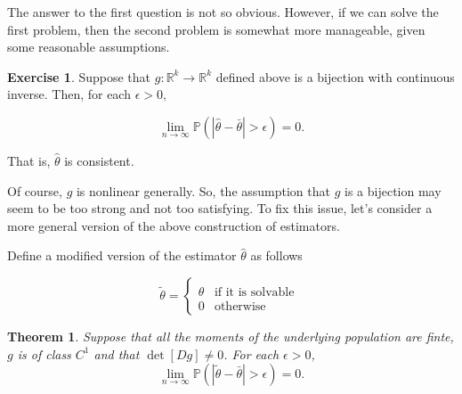 \documentclass[
  openany]{book}
\newtheorem{theorem}{Theorem}[chapter]
\theoremstyle{definition}
\theoremstyle{definition}
\theoremstyle{definition}
\newtheorem{exercise}{Exercise}[chapter]
\theoremstyle{definition}
\theoremstyle{remark}
\begin{document}
The answer to the first question is not so obvious.
However, if we can solve the first problem, then the second problem is
somewhat more manageable, given some reasonable assumptions.

\begin{exercise}
Suppose that \(g:\mathbb{R}^k \to \mathbb{R}^k\) defined above is a bijection with continuous inverse.
Then, for each \(\epsilon >0\),

\[\lim_{n\to \infty}\mathbb{P}( |\hat \theta - \bar \theta|   >  \epsilon) =0.\]

That is, \(\hat \theta\) is consistent.
\end{exercise}

Of course, \(g\) is nonlinear generally. So, the assumption that \(g\) is a bijection may seem to
be too strong and not too satisfying.
To fix this issue, let's consider a more general version of the above construction of estimators.

Define a modified version of the estimator \(\hat \theta\) as follows

\[ \tilde \theta =
\begin{cases} \hat \theta & \text{if it is solvable } \\
   0 & \text{otherwise}\end{cases}\]

\begin{theorem}
Suppose that all the moments of the underlying population are finte,
\(g\) is of class \(C^1\) and that \(\det[Dg]\not= 0\).
For each \(\epsilon >0\),
\[\lim_{n\to \infty}\mathbb{P}( |\tilde \theta - \bar \theta| > \epsilon ) = 0.\]
\end{theorem}
\end{document}
